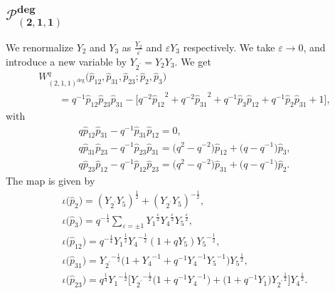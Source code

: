 \documentclass[pdftex]{sigma}
\numberwithin{equation}{section}
\begin{document}
\subsection[$\mathcal{P}_{(2,1,1)}^{\text{deg}}$]{$\boldsymbol{\mathcal{P}_{(2,1,1)}^{\text{deg}}}$}
We renormalize $Y_2$ and $Y_3$ as $\frac{Y_2}{\varepsilon}$ and $\varepsilon Y_3$ respectively. We take $\varepsilon \to 0 $, and introduce a new variable by $Y_{2^\prime} = Y_2 Y_3$. We get
\begin{gather*}
 W^q_{(2,1,1)^{\text{deg}}}\big(\hat{p}_{12}, \hat{p}_{31}, \hat{p}_{23} ; \hat{p}_2, \hat{p}_3\big) \\
 \qquad{}= q^{-1} \hat{p}_{12} \hat{p}_{23} \hat{p}_{31} - \big[ q^{-2} {\hat{p}_{12}}^{2} + q^{-2} {\hat{p}_{31}}^{2} + q^{-1} \hat{p}_3 \hat{p}_{12} + q^{-1} \hat{p}_2 \hat{p}_{31} + 1 \big],
\end{gather*}
with
\begin{gather*}
q \hat{p}_{12} \hat{p}_{31} - q^{-1} \hat{p}_{31} \hat{p}_{12} =0 , \\
q \hat{p}_{31} \hat{p}_{23} - q^{-1} \hat{p}_{23} \hat{p}_{31} = \big(q^2 - q^{-2}\big) \hat{p}_{12} + \big(q-q^{-1}\big) \hat{p}_3 , \\
q \hat{p}_{23} \hat{p}_{12} - q^{-1} \hat{p}_{12} \hat{p}_{23} = \big(q^2 - q^{-2}\big) \hat{p}_{31} + \big(q-q^{-1}\big) \hat{p}_2 .
\end{gather*}
The map is given by
\begin{gather*}
\iota\big(\hat{p}_2\big) = (Y_{2^\prime} Y_5)^{\frac{1}{2}} + (Y_{2^\prime} Y_5)^{-\frac{1}{2}} , \\
\iota\big(\hat{p}_3\big) = q^{-\frac{1}{4}} \sum_{\varepsilon=\pm 1} {Y_1}^{\frac{\varepsilon}{2}} {Y_4}^{\frac{\varepsilon}{2}} {Y_5}^{\frac{\varepsilon}{2}} , \\
\iota\big(\hat{p}_{12}\big) = q^{-\frac{1}{4}} {Y_1}^{\frac{1}{2}} {Y_4}^{-\frac{1}{2}} ( 1 + q Y_5 ) {Y_5}^{-\frac{1}{2}} , \\
\iota\big(\hat{p}_{31}\big) = {Y_{2^\prime}}^{-\frac{1}{2}} \big( 1 + {Y_4}^{-1} + q^{-1} {Y_4}^{-1} {Y_5}^{-1}\big) {Y_5}^{\frac{1}{2}} , \\
\iota\big(\hat{p}_{23}\big) = q^{\frac{1}{4}} {Y_1}^{-\frac{1}{2}} \big[ {Y_{2^\prime}}^{-\frac{1}{2}} \big( 1 + q^{-1} {Y_4}^{-1} \big) + \big( 1 + q^{-1} Y_1\big) {Y_{2^\prime}}^{\frac{1}{2}}\big] {Y_4}^{\frac{1}{2}} .
\end{gather*}
\end{document}
